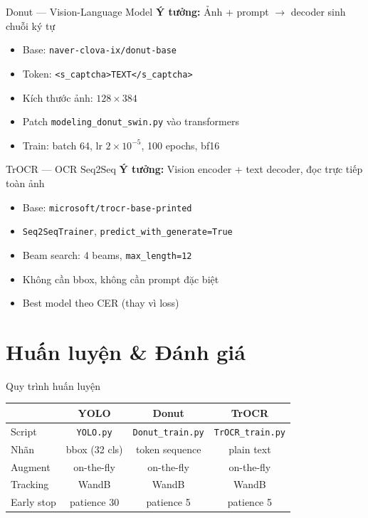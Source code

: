 \documentclass[aspectratio=169,12pt]{beamer}
\begin{document}
\begin{frame}{Donut --- Vision-Language Model}
  \textbf{Ý tưởng:} Ảnh + prompt $\rightarrow$ decoder sinh chuỗi ký tự

  \vspace{0.2cm}
  \begin{itemize}
    \item Base: \texttt{naver-clova-ix/donut-base}
    \item Token: \texttt{<s\_captcha>TEXT</s\_captcha>}
    \item Kích thước ảnh: $128 \times 384$
    \item Patch \texttt{modeling\_donut\_swin.py} vào transformers
    \item Train: batch 64, lr $2 \times 10^{-5}$, 100 epochs, bf16
  \end{itemize}
\end{frame}

\begin{frame}{TrOCR --- OCR Seq2Seq}
  \textbf{Ý tưởng:} Vision encoder + text decoder, đọc trực tiếp toàn ảnh

  \vspace{0.2cm}
  \begin{itemize}
    \item Base: \texttt{microsoft/trocr-base-printed}
    \item \texttt{Seq2SeqTrainer}, \texttt{predict\_with\_generate=True}
    \item Beam search: 4 beams, \texttt{max\_length=12}
    \item Không cần bbox, không cần prompt đặc biệt
    \item Best model theo CER (thay vì loss)
  \end{itemize}
\end{frame}

\section{Huấn luyện \& Đánh giá}

\begin{frame}{Quy trình huấn luyện}
  \begin{table}
    \centering
    \small
    \begin{tabular}{lccc}
      \toprule
      & \textbf{YOLO} & \textbf{Donut} & \textbf{TrOCR} \\
      \midrule
      Script & \texttt{YOLO.py} & \texttt{Donut\_train.py} & \texttt{TrOCR\_train.py} \\
      Nhãn & bbox (32 cls) & token sequence & plain text \\
      Augment & on-the-fly & on-the-fly & on-the-fly \\
      Tracking & WandB & WandB & WandB \\
      Early stop & patience 30 & patience 5 & patience 5 \\
      \bottomrule
    \end{tabular}
  \end{table}
\end{frame}
\end{document}
